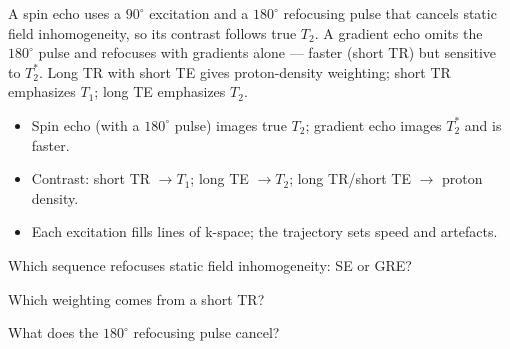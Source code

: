 \begin{workedexample}
A spin echo uses a $90^{\circ}$ excitation and a $180^{\circ}$ refocusing
pulse that cancels static field inhomogeneity, so its contrast follows true
$T_2$. A gradient echo omits the $180^{\circ}$ pulse and refocuses with gradients
alone --- faster (short TR) but sensitive to $T_2^{*}$. Long TR with short TE gives
proton-density weighting; short TR emphasizes $T_1$; long TE emphasizes $T_2$.
\end{workedexample}

\begin{keytakeaways}
\begin{itemize}[leftmargin=1.4em,itemsep=2pt]
\item Spin echo (with a $180^{\circ}$ pulse) images true $T_2$; gradient echo images $T_2^{*}$ and is faster.
\item Contrast: short TR $\to T_1$; long TE $\to T_2$; long TR/short TE $\to$ proton density.
\item Each excitation fills lines of k-space; the trajectory sets speed and artefacts.
\end{itemize}
\end{keytakeaways}

\begin{exercises}
\item Which sequence refocuses static field inhomogeneity: SE or GRE?
\item Which weighting comes from a short TR?
\item What does the $180^{\circ}$ refocusing pulse cancel?
\end{exercises}

